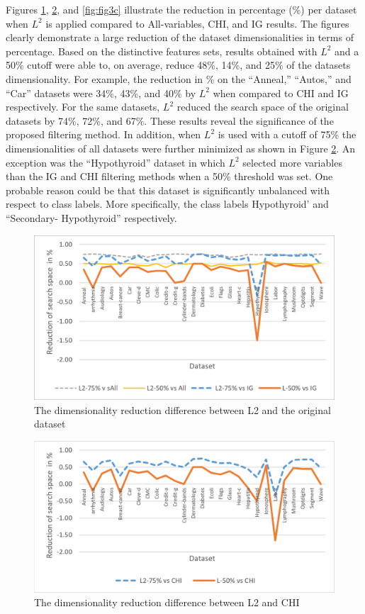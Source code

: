 \documentclass[review]{elsarticle}
\begin{document}
Figures \ref{fig:fig3a}, \ref{fig:fig3b}, and \ref{fig:fig3c} illustrate the reduction in percentage (\%) per dataset when $ L^2 $ is applied compared to All-variables, CHI, and IG results. The figures clearly demonstrate a large reduction of the dataset dimensionalities in terms of percentage. Based on the distinctive features sets, results obtained with $ L^2 $ and a 50\% cutoff were able to, on average, reduce 48\%, 14\%, and 25\% of the datasets dimensionality. For example, the reduction in \% on the “Anneal,” “Autos,” and “Car” datasets were 34\%, 43\%, and 40\% by $ L^2 $ when compared to CHI and IG respectively. For the same datasets, $ L^2 $ reduced the search space of the original datasets by 74\%, 72\%, and 67\%. These results reveal the significance of the proposed filtering method. In addition, when $ L^2 $ is used with a cutoff of 75\% the dimensionalities of all datasets were further minimized as shown in Figure \ref{fig:fig3b}.  An exception was the “Hypothyroid” dataset in which $ L^2 $ selected more variables than the IG and CHI filtering methods when a 50\% threshold was set. One probable reason could be that this dataset is significantly unbalanced with respect to class labels. More specifically, the class labels Hypothyroid’ and “Secondary- Hypothyroid” respectively. 

\begin{figure}[h]
	\centering
	\includegraphics[width=0.8\linewidth]{figs/fig_3a}
	\caption[fig 3a]{The dimensionality reduction difference between L2 and the original dataset}
	\label{fig:fig3a}
\end{figure}


\begin{figure}[h]
	\centering
	\includegraphics[width=0.8\linewidth]{figs/fig_3b}
	\caption[fig 3b]{The dimensionality reduction difference between L2 and CHI}
	\label{fig:fig3b}
\end{figure}
\end{document}
